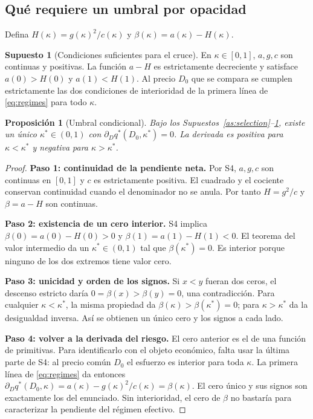 \documentclass[11pt]{article}
\newtheorem{proposition}{Proposición}
\theoremstyle{definition}\newtheorem{assumption}{Supuesto}
\begin{document}
\subsection{Qué requiere un umbral por opacidad}
Defina $H(\kappa)=g(\kappa)^2/c(\kappa)$ y
$\beta(\kappa)=a(\kappa)-H(\kappa)$.
\begin{assumption}[Condiciones suficientes para el cruce]\label{as:cross}
En $\kappa\in[0,1]$, $a,g,c$ son continuas y positivas. La función
$a-H$ es estrictamente decreciente y satisface $a(0)>H(0)$ y $a(1)<H(1)$.
Al precio $D_0$ que se compara se cumplen estrictamente las dos condiciones
de interioridad de la primera línea de \eqref{eq:regimes} para todo $\kappa$.
\end{assumption}
\begin{proposition}[Umbral condicional]\label{p:threshold}
Bajo los Supuestos~\ref{as:selection}--\ref{as:cross}, existe un único
$\kappa^*\in(0,1)$ con $\partial_Dq^*(D_0,\kappa^*)=0$. La derivada es
positiva para $\kappa<\kappa^*$ y negativa para $\kappa>\kappa^*$.
\end{proposition}
\begin{proof}
\textbf{Paso 1: continuidad de la pendiente neta.}
Por S4, $a,g,c$ son continuas en $[0,1]$ y $c$ es estrictamente positiva.
El cuadrado y el cociente conservan continuidad cuando el denominador no se
anula. Por tanto $H=g^2/c$ y $\beta=a-H$ son continuas.

\textbf{Paso 2: existencia de un cero interior.}
S4 implica $\beta(0)=a(0)-H(0)>0$ y $\beta(1)=a(1)-H(1)<0$. El teorema
del valor intermedio da un $\kappa^*\in(0,1)$ tal que $\beta(\kappa^*)=0$.
Es interior porque ninguno de los dos extremos tiene valor cero.

\textbf{Paso 3: unicidad y orden de los signos.}
Si $x<y$ fueran dos ceros, el descenso estricto daría
$0=\beta(x)>\beta(y)=0$, una contradicción. Para cualquier
$\kappa<\kappa^*$, la misma propiedad da
$\beta(\kappa)>\beta(\kappa^*)=0$; para $\kappa>\kappa^*$ da la desigualdad
inversa. Así se obtienen un único cero y los signos a cada lado.

\textbf{Paso 4: volver a la derivada del riesgo.}
El cero anterior es el de una función de primitivas. Para identificarlo
con el objeto económico, falta usar la última parte de S4: al precio común
$D_0$ el esfuerzo es interior para toda $\kappa$. La primera línea de
\eqref{eq:regimes} da entonces
$\partial_Dq^*(D_0,\kappa)=a(\kappa)-g(\kappa)^2/c(\kappa)=\beta(\kappa)$.
El cero único y sus signos son exactamente los del enunciado. Sin
interioridad, el cero de $\beta$ no bastaría para caracterizar la pendiente
del régimen efectivo.
\end{proof}
\end{document}
